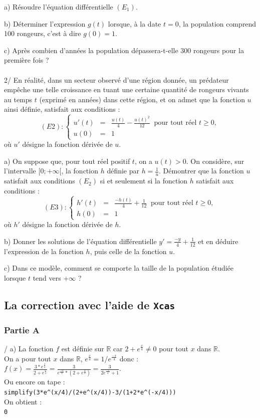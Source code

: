 \documentclass[a4paper,11pt]{book}
\begin{document}
a) R\'esoudre l'\'equation diff\'erentielle $(E_1)$.

b) D\'eterminer l'expression $g(t)$ lorsque, \`a la date $t=0$, la population 
comprend 100 rongeurs, c'est \`a dire $g(0)=1$.

c) Apr\`es combien d'ann\'ees la population d\'epassera-t-elle 300 rongeurs 
pour la premi\`ere fois ?\\
\ \\
2/ En r\'ealit\'e, dans un secteur observ\'e d'une r\'egion donn\'ee, un 
pr\'edateur emp\^eche une telle croissance en tuant une certaine quantit\'e de 
rongeurs vivants au temps $t$ (exprim\'e en ann\'ees) dans cette r\'egion, et
on admet que la fonction $u$ ainsi d\'efinie, satisfait aux conditions :\\
$$ (E2): \left\{
\begin{array}{rcl}
 u'(t)&=&\displaystyle\frac{u(t)}{4}-\frac{u(t)^2}{12} \ \mbox{  pour tout r\'eel } t\geq 0,\\
u(0)&=&1
\end{array}
\right.
$$
o\`u $u'$ d\'esigne la fonction d\'eriv\'ee de $u$.

a) On suppose que, pour tout r\'eel positif $t$, on a $u(t) > 0$. On 
consid\`ere, sur l'intervalle  $[0;+\infty[$, la fonction $h$ d\'efinie par 
$\displaystyle h=\frac{1}{u}$. D\'emontrer que la fonction $u$ satisfait aux 
conditions $(E_2)$ si et seulement si la fonction $h$ satisfait aux 
conditions :
$$ (E3): \left\{
\begin{array}{rcl}
h'(t)&=&\displaystyle \frac{-h(t)}{4}+\frac{1}{12} \ \mbox{  pour tout r\'eel } t\geq 0,\\
h(0)&=&1
\end{array}
\right.
$$
o\`u $h'$ d\'esigne la fonction d\'eriv\'ee de $h$.

b) Donner les solutions  de l'\'equation diff\'erentielle 
$\displaystyle y'=\frac{-y}{4}+\frac{1}{12}$ et en d\'eduire l'expression de la
fonction $h$, puis celle de la fonction $u$.

c) Dans ce mod\`ele, comment se comporte la taille de la population \'etudi\'ee
lorsque $t$ tend vers $+\infty$ ?
\subsection{La correction avec l'aide de {\tt Xcas}}
\subsubsection{Partie A}
/  a) La fonction $f$ est d\'efinie sur $\mathbb R$ car 
$2+e^{\frac{x}{4}} \neq 0$ pour tout $x$ dans $\mathbb R$.\\
On a pour tout $x$ dans $\mathbb R$, $e^{\frac{x}{4}}=1/e^{\frac{-x}{4}}$ donc :\\
$\displaystyle f(x)=\frac{3*e^{\frac{x}{4}}}{2+e^{\frac{x}{4}}}=\frac{3}{e^{\frac{-x}{4}}*(2+e^{\frac{x}{4}})}=\frac{3}{2e^{\frac{-x}{4}}+1}$.\\
Ou encore on tape :\\
{\tt simplify(3*e\verb|^|(x/4)/(2+e\verb|^|(x/4))-3/(1+2*e\verb|^|(-x/4)))}\\
On obtient :\\
{\tt 0}
\end{document}
